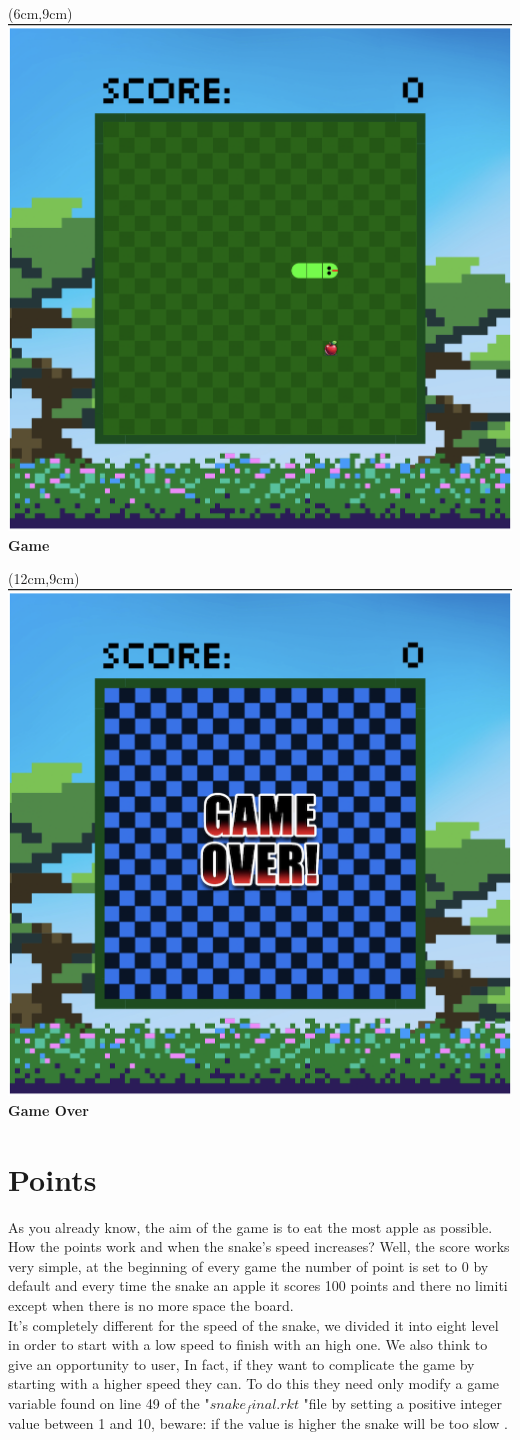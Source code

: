 \documentclass{article}
\begin{document}
	\begin{textblock*}{10cm}(6cm,9cm)
		\centering
		\includegraphics[width=.5\linewidth]{game.png}\\
		\Large{\textbf{Game}}
	\end{textblock*}
	
	\begin{textblock*}{10cm}(12cm,9cm)
		\centering
		\includegraphics[width=.5\linewidth]{game-over.png}\\
		\Large{\textbf{Game Over}}
	\end{textblock*}
	
	
	
	\vspace{6.5cm}\section{Points}
	As you already know, the aim of the game is to eat the most apple as possible. How the points work and when the snake's speed increases? Well, the score works very simple, at the beginning of every game the number of point is set to 0 by default and every time the snake an apple it scores 100 points and there no limiti except when there is no more space the board.\\
	It's completely different for the speed of the snake, we divided it into eight level in order to start with a low speed to finish with an high one. We also think to give an opportunity to user, In fact, if they want to complicate the game by starting with a higher speed they can. To do this they need only modify a game variable found on line 49 of the "$snake_final.rkt$ "file by setting a positive integer value between 1 and 10, beware: if the value is higher the snake will be too slow	.
	
\end{document}
